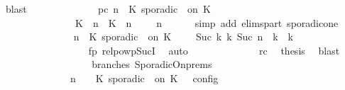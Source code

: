 \begin{isabellebody}
\ blast\isanewline
\ \ \ \ \ \ \ \ \ \ \ \ \isamarkupfalse%
\ pc{\isacharcolon}{\isacartoucheopen}{\isacharparenleft}{\isasymGamma}{\isacharcomma}\ n\ {\isasymturnstile}\ {\isacharparenleft}{\isacharparenleft}K\ sporadic\ {\isasymtau}\ on\ K\ {\isacharhash}\ {\isasymPsi}{\isacharparenright}\ {\isasymtriangleright}\ {\isasymPhi}{\isacharparenright}\isanewline
\ \ \ \ \ \ \ \ \ \ \ \ \ \ {\isasymhookrightarrow}\ {\isacharparenleft}{\isacharparenleft}{\isacharparenleft}K\ {\isasymUp}\ n{\isacharparenright}\ {\isacharhash}\ {\isacharparenleft}K\ {\isasymDown}\ n\ {\isacharat}\ {\isasymtau}{\isacharparenright}\ {\isacharhash}\ {\isasymGamma}{\isacharparenright}{\isacharcomma}\ n\ {\isasymturnstile}\ {\isasymPsi}\ {\isasymtriangleright}\ {\isasymPhi}{\isacharparenright}{\isacartoucheclose}\ \isamarkupfalse%
\ {\isacharparenleft}simp\ add{\isacharcolon}\ elims{\isacharunderscore}part\ sporadic{\isacharunderscore}on{\isacharunderscore}e{}{\isacharparenright}\isanewline
\ \ \ \ \ \ \ \ \ \ \ \ \isamarkupfalse%
\ {\isacartoucheopen}{\isacharparenleft}{\isasymGamma}{\isacharcomma}\ n\ {\isasymturnstile}\ {\isacharparenleft}K\ sporadic\ {\isasymtau}\ on\ K\ {\isacharhash}\ {\isasymPsi}\ {\isasymtriangleright}\ {\isasymPhi}{\isacharparenright}\ {\isasymhookrightarrow}\isactrlbsup Suc\ k\isactrlesup \ {\isacharparenleft}{\isasymGamma}\isactrlsub k{\isacharcomma}\ Suc\ n\ {\isasymturnstile}\ {\isasymPsi}\isactrlsub k\ {\isasymtriangleright}\ {\isasymPhi}\isactrlsub k{\isacharparenright}{\isacartoucheclose}\isanewline
\ \ \ \ \ \ \ \ \ \ \ \ \ \ \ \ \isamarkupfalse%
\ fp\ relpowp{\isacharunderscore}Suc{\isacharunderscore}I{}\ \isamarkupfalse%
\ auto\isanewline
\ \ \ \ \ \ \ \ \ \ \ \ \isamarkupfalse%
\ rc\ \isamarkupfalse%
\ {\isacharquery}thesis\ \isamarkupfalse%
\ blast\isanewline
\ \ \ \ \ \ \ \ \isamarkupfalse%
\isanewline
\ \ \ \ \ \ \ \ \isamarkupfalse%
\ branches\ SporadicOn{\isachardot}prems{\isacharparenleft}{}{\isacharparenright}\ \isamarkupfalse%
\isanewline
\ \ \ \ \ \ \ \ \ \ {\isacartoucheopen}{\isasymrho}\ {\isasymin}\ {\isasymlbrakk}\ {\isasymGamma}{\isacharcomma}\ n\ {\isasymturnstile}\ {\isasymPsi}\ {\isasymtriangleright}\ {\isacharparenleft}{\isacharparenleft}K\ sporadic\ {\isasymtau}\ on\ K\ {\isacharhash}\ {\isasymPhi}{\isacharparenright}\ {\isasymrbrakk}\isactrlsub c\isactrlsub o\isactrlsub n\isactrlsub f\isactrlsub i\isactrlsub g\isanewline

\end{isabellebody}
